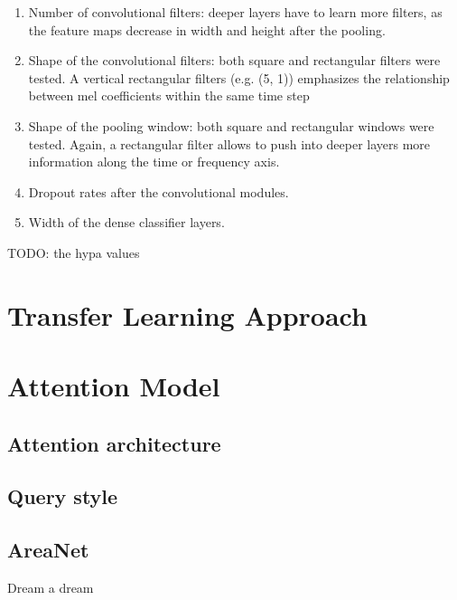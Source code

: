 \begin{enumerate}
    \item Number of convolutional filters: deeper layers have to learn more
        filters, as the feature maps decrease in width and height after the
        pooling.
    \item Shape of the convolutional filters:
        both square and rectangular filters were tested.
        A vertical rectangular filters (e.g. (5, 1)) emphasizes the
        relationship between mel coefficients within the same time step
    \item Shape of the pooling window: 
        both square and rectangular windows were tested.
        Again, a rectangular filter allows to push into deeper layers more
        information along the time or frequency axis.
    \item Dropout rates after the convolutional modules.
    \item Width of the dense classifier layers.
\end{enumerate}

TODO: the hypa values

\section{Transfer Learning Approach}
\label{sec:transfer_learning}

\section{Attention Model}
\label{sec:attention_model}

\subsection{Attention architecture}

\subsection{Query style}

\subsection{AreaNet}

Dream a dream

